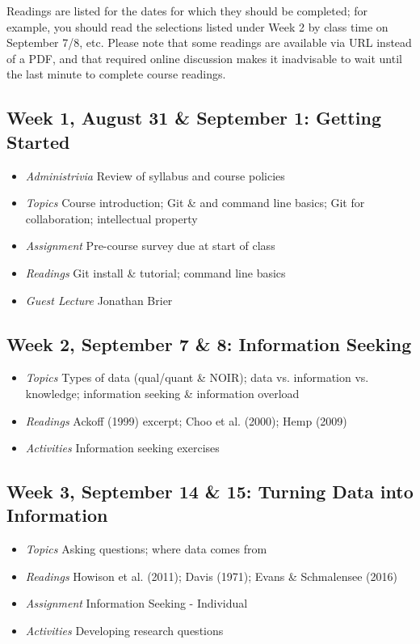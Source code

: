 \documentclass[11pt]{article}
\begin{document}
Readings are listed for the dates for which they should be completed; for example, you should read the selections listed under Week 2 by class time on September 7/8, etc. Please note that some readings are available via URL instead of a PDF, and that required online discussion makes it inadvisable to wait until the last minute to complete course readings.

\subsection*{Week 1, August 31 \& September 1: Getting Started}

\begin{itemize}
\item \textit{Administrivia} Review of syllabus and course policies
\item \textit{Topics} Course introduction; Git \& and command line basics; Git for collaboration; intellectual property
\item \textit{Assignment} Pre-course survey due at start of class
\item \textit{Readings} Git install \& tutorial; command line basics
\item \textit{Guest Lecture} Jonathan Brier
\end{itemize}

\subsection*{Week 2, September 7 \& 8: Information Seeking}

\begin{itemize}
\item \textit{Topics} Types of data (qual/quant \& NOIR); data vs. information vs. knowledge; information seeking \& information overload
\item \textit{Readings} Ackoff (1999) excerpt; Choo et al. (2000); Hemp (2009)
\item \textit{Activities} Information seeking exercises
\end{itemize}

\subsection*{Week 3, September 14 \& 15: Turning Data into Information}

\begin{itemize}
\item \textit{Topics} Asking questions; where data comes from
\item \textit{Readings} Howison et al. (2011); Davis (1971); Evans \& Schmalensee (2016)
\item \textit{Assignment} Information Seeking - Individual
\item \textit{Activities} Developing research questions
\end{itemize}
\end{document}
